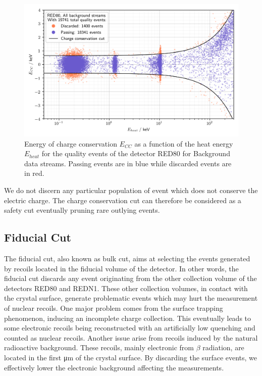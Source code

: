 \begin{figure}
\centering
\includegraphics[width=\linewidth,]{Figures/Neutron/charge_conservation.png}
\caption{Energy of charge conservation $E_{CC}$ as a function of the heat energy $E_{heat}$ for the quality events of the detector RED80 for Background data streams. Passing events are in blue while discarded events are in red.}
\label{fig:charge-conservation}
\end{figure}

We do not discern any particular population of event which does not conserve the electric charge. The charge conservation cut can therefore be considered as a safety cut eventually pruning rare outlying events.


\subsection{Fiducial Cut}
\label{par:fiducial-cut}

The fiducial cut, also known as bulk cut, aims at selecting the events generated by recoils located in the fiducial volume of the detector. In other words, the fiducial cut discards any event originating from the other collection volume of the detectors RED80 and REDN1. These other collection volumes, in contact with the crystal surface, generate problematic events which may hurt the measurement of nuclear recoils.
One major problem comes from the surface trapping phenomenon, inducing an incomplete charge collection. This eventually leads to some electronic recoils being reconstructed with an artificially low quenching and counted as nuclear recoils.
Another issue arise from recoils induced by the natural radioactive background. These recoils, mainly electronic from $\beta$ radiation, are located in the first \si{\micro\meter} of the crystal surface. By discarding the surface events, we effectively lower the electronic background affecting the measurements.

